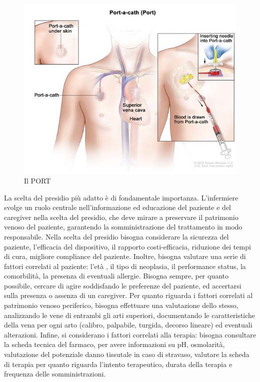 \begin{figure}[H]
    \begin{center}
    \includegraphics[width=0.6\columnwidth]{img/PORT.jpeg}
    \end{center}
    \caption{Il PORT
    \cite{img42}}
    \label{fig:FIGURE_4.5}
\end{figure}

La scelta del presidio più adatto è di fondamentale importanza. L’infermiere svolge un ruolo centrale 
nell’informazione ed educazione del paziente e del caregiver nella scelta del presidio, che deve mirare a preservare 
il patrimonio venoso del paziente, garantendo la somministrazione del trattamento in modo responsabile. 
Nella scelta del presidio bisogna considerare la sicurezza del paziente, l’efficacia del dispositivo, il rapporto 
costi-efficacia, riduzione dei tempi di cura, migliore compliance del paziente. Inoltre, bisogna valutare una serie 
di fattori correlati al paziente:  l’età , il tipo di  neoplasia, il performance status, la comorbilità, la presenza 
di eventuali allergie. Bisogna sempre, per quanto possibile, cercare di agire soddisfando le preferenze del paziente, 
ed accertarsi sulla presenza o assenza di un caregiver. Per quanto riguarda i fattori correlati al patrimonio 
venoso periferico, bisogna effettuare una valutazione dello stesso, analizzando le vene di entrambi gli arti superiori,
documentando le caratteristiche della vena per ogni arto (calibro, palpabile, turgida, decorso lineare) ed eventuali 
alterazioni. Infine, si considerano i fattori correlati alla terapia: bisogna consultare la scheda tecnica del farmaco,
per avere informazioni su pH, osmolarità, valutazione del potenziale danno tissutale in caso di stravaso, valutare la 
scheda di terapia per quanto riguarda l’intento terapeutico, durata della terapia e frequenza delle somministrazioni\cite{AIOMCVC}.\\

